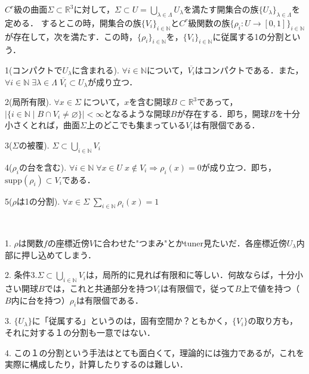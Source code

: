 \documentclass[uplatex, dvipdfmx]{jsreport}
\begin{document}
\begin{theorem}\label{thm-partition-of-unity}
    $C^r$級の曲面$\Sigma\subset\mathbb{R}^3$に対して，$\Sigma\subset U=\bigcup_{\lambda\in\Lambda}U_\lambda$を満たす開集合の族$\{U_\lambda\}_{\lambda\in\Lambda}$を定める．
    するとこの時，開集合の族$\{V_i\}_{i\in\mathbb{N}}$と$C^r$級関数の族$\{\rho_i:U\to [0,1]\}_{i\in\mathbb{N}}$が存在して，次を満たす．この時，$\{\rho_i\}_{i\in\mathbb{N}}$を，$\{V_i\}_{i\in\mathbb{N}}$に従属する1の分割という．

    1(コンパクトで$U_\lambda$に含まれる). $\forall i\in\mathbb{N}$について，$\overline{V_i}$はコンパクトである．また，$\forall i\in\mathbb{N}\;\exists \lambda\in\Lambda \;\overline{V_i}\subset U_\lambda$が成り立つ．

    2(局所有限). $\forall x\in\Sigma\;$について，$x$を含む開球$B\subset\mathbb{R}^3$であって，$|\{ i\in\mathbb{N}\mid B\cap V_i\ne\varnothing \}|<\infty$となるような開球$B$が存在する．即ち，開球$B$を十分小さくとれば，曲面$\Sigma$上のどこでも集まっている$V_i$は有限個である．

    3($\Sigma$の被覆). $\Sigma\subset\bigcup_{i\in\mathbb{N}}V_i$

    4($\rho_i$の台を含む). $\forall i\in\mathbb{N}\; \forall x\in U\;x\notin V_i\Rightarrow \rho_i(x)=0$が成り立つ．即ち，$\mathrm{supp}(\rho_i)\subset V_i$である．

    5($\rho$は1の分割). $\forall x\in\Sigma \; \sum_{i\in\mathbb{N}}\rho_i(x)=1$
\end{theorem}
\begin{remark}　

    1. $\rho$は関数$f$の座標近傍$V$に合わせた"つまみ"とかtuner見たいだ．各座標近傍$U_\lambda$内部に押し込めてしまう．

    2. 条件3.$\Sigma\subset\bigcup_{i\in\mathbb{N}}V_i$は，局所的に見れば有限和に等しい．何故ならば，十分小さい開球$B$では，これと共通部分を持つ$V_i$は有限個で，従って$B$上で値を持つ（$B$内に台を持つ）$\rho_i$は有限個である．

    3. $\{U_\lambda\}$に「従属する」というのは，固有空間か？ともかく，$\{V_i\}$の取り方も，それに対する１の分割も一意ではない．

    4. この１の分割という手法はとても面白くて，理論的には強力であるが，これを実際に構成したり，計算したりするのは難しい．
\end{remark}
\end{document}
